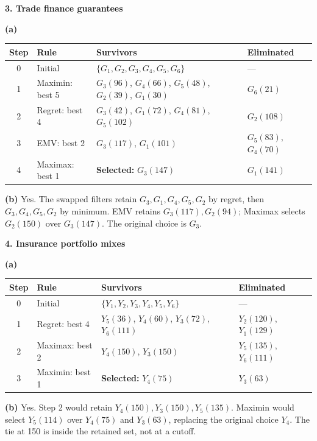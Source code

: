 \begin{studentproblem}
\textbf{3. Trade finance guarantees}\par
\textbf{(a)}
\begin{center}
\small
\begin{tabularx}{\textwidth}{@{}c >{\raggedright\arraybackslash}X >{\raggedright\arraybackslash}p{} >{\raggedright\arraybackslash}p{}@{}}
\toprule
Step & Rule & Survivors & Eliminated \\
\midrule
0 & Initial & $\{G_1,G_2,G_3,G_4,G_5,G_6\}$ & --- \\
1 & Maximin: best 5 & $G_3(96)$, $G_4(66)$, $G_5(48)$, $G_2(39)$, $G_1(30)$ & $G_6(21)$ \\
2 & Regret: best 4 & $G_3(42)$, $G_1(72)$, $G_4(81)$, $G_5(102)$ & $G_2(108)$ \\
3 & EMV: best 2 & $G_3(117)$, $G_1(101)$ & $G_5(83)$, $G_4(70)$ \\
4 & Maximax: best 1 & \textbf{Selected:} $G_3(147)$ & $G_1(141)$ \\
\bottomrule
\end{tabularx}
\end{center}
\textbf{(b)} Yes. The swapped filters retain $G_3,G_1,G_4,G_5,G_2$ by regret, then $G_3,G_4,G_5,G_2$ by minimum. EMV retains $G_3(117),G_2(94)$; Maximax selects $G_2(150)$ over $G_3(147)$. The original choice is $G_3$.
\end{studentproblem}
\newpage

\begin{studentproblem}
\textbf{4. Insurance portfolio mixes}\par
\textbf{(a)}
\begin{center}
\small
\begin{tabularx}{\textwidth}{@{}c >{\raggedright\arraybackslash}X >{\raggedright\arraybackslash}p{} >{\raggedright\arraybackslash}p{}@{}}
\toprule
Step & Rule & Survivors & Eliminated \\
\midrule
0 & Initial & $\{Y_1,Y_2,Y_3,Y_4,Y_5,Y_6\}$ & --- \\
1 & Regret: best 4 & $Y_5(36)$, $Y_4(60)$, $Y_3(72)$, $Y_6(111)$ & $Y_2(120)$, $Y_1(129)$ \\
2 & Maximax: best 2 & $Y_4(150)$, $Y_3(150)$ & $Y_5(135)$, $Y_6(111)$ \\
3 & Maximin: best 1 & \textbf{Selected:} $Y_4(75)$ & $Y_3(63)$ \\
\bottomrule
\end{tabularx}
\end{center}
\textbf{(b)} Yes. Step 2 would retain $Y_4(150),Y_3(150),Y_5(135)$. Maximin would select $Y_5(114)$ over $Y_4(75)$ and $Y_3(63)$, replacing the original choice $Y_4$. The tie at 150 is inside the retained set, not at a cutoff.
\end{studentproblem}

